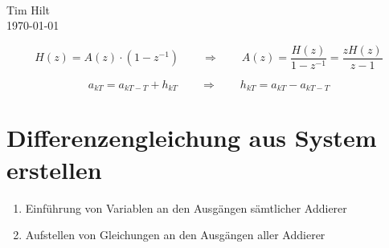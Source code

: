 \documentclass[10pt,a5paper]{scrartcl}
\begin{document}
{\\[1ex]
  Tim Hilt\\
  \today
  \par}

\vfill

\tableofcontents
\clearpage

\[H(z) = A(z) \cdot (1 - z^{-1}) \qquad\Rightarrow\qquad A(z) = \frac{H(z)}{1 - z^{-1}} = \frac{zH(z)}{z-1}\]

\[a_{kT} = a_{kT - T} + h_{kT} \qquad\Rightarrow\qquad h_{kT} = a_{kT} - a_{kT - T}\]

\section{Differenzengleichung aus System erstellen}

\begin{enumerate}
\item Einführung von Variablen an den Ausgängen sämtlicher Addierer
\item Aufstellen von Gleichungen an den Ausgängen aller Addierer
\end{enumerate}
\end{document}
